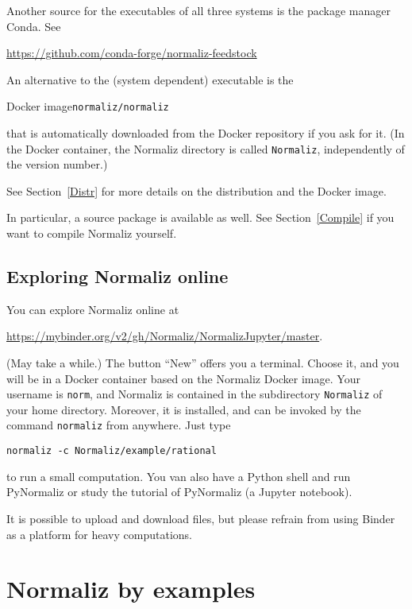 \documentclass[12pt,a4paper]{scrartcl}
\theoremstyle{definition}
\begin{document}
Another source for the executables of all three systems is the package manager Conda. See
\begin{center}
	\url{https://github.com/conda-forge/normaliz-feedstock}
\end{center}


An alternative to the (system dependent) executable is the
\begin{center}
	Docker image\qquad \verb|normaliz/normaliz|
\end{center}
that is automatically downloaded from the Docker repository if you ask for it. (In the Docker container, the Normaliz directory is called \verb|Normaliz|, independently of the version number.)

See Section~\ref{Distr} for more details on the distribution and the Docker image.

In particular, a source package is available as well. See Section~\ref{Compile} if you want to compile Normaliz yourself.

\subsection{Exploring Normaliz online}

You can explore Normaliz online at
\begin{center}
	\url{https://mybinder.org/v2/gh/Normaliz/NormalizJupyter/master}.
\end{center}
(May take a while.) The button ``New'' offers you a terminal. Choose it, and you will be in a Docker container based on the Normaliz Docker image. Your username is \verb|norm|, and Normaliz is contained in the subdirectory \verb|Normaliz| of your home directory. Moreover, it is installed, and can be invoked by the command \verb|normaliz| from anywhere. Just type
\begin{Verbatim}
normaliz -c Normaliz/example/rational
\end{Verbatim}
to run a small computation. You van also have a Python shell and run PyNormaliz or study the tutorial of PyNormaliz (a Jupyter notebook).

It is possible to upload and download files, but please refrain from using Binder as a platform for heavy computations.



\section{Normaliz by examples}\label{Examples}
\end{document}
